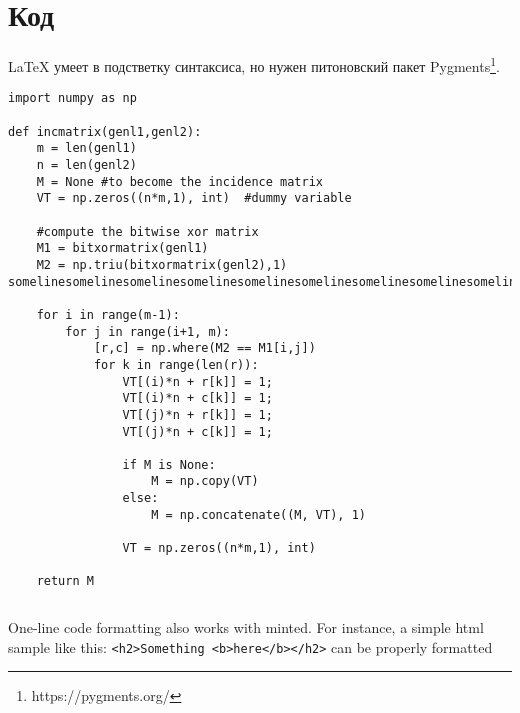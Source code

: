 \section{Код}

\LaTeX{} умеет в подстветку синтаксиса,
но нужен питоновский пакет Pygments\footnote{https://pygments.org/}.

\begin{verbatim}
import numpy as np
    
def incmatrix(genl1,genl2):
    m = len(genl1)
    n = len(genl2)
    M = None #to become the incidence matrix
    VT = np.zeros((n*m,1), int)  #dummy variable
    
    #compute the bitwise xor matrix
    M1 = bitxormatrix(genl1)
    M2 = np.triu(bitxormatrix(genl2),1) 
somelinesomelinesomelinesomelinesomelinesomelinesomelinesomelinesomelinesomeline,somelinesomelinesomelinesomelinesomelinesomelinesomelinesomelinesomelinesomeline

    for i in range(m-1):
        for j in range(i+1, m):
            [r,c] = np.where(M2 == M1[i,j])
            for k in range(len(r)):
                VT[(i)*n + r[k]] = 1;
                VT[(i)*n + c[k]] = 1;
                VT[(j)*n + r[k]] = 1;
                VT[(j)*n + c[k]] = 1;
                
                if M is None:
                    M = np.copy(VT)
                else:
                    M = np.concatenate((M, VT), 1)
                
                VT = np.zeros((n*m,1), int)
    
    return M
\end{verbatim}

\begin{listing}[H]
\caption{example.c}\label{lst:example}
\inputminted{c}{inc/example.c}
\end{listing}

One-line code formatting also works with minted. For instance, a simple html 
sample like this:
\texttt{<h2>Something <b>here</b></h2>}
can be properly 
formatted

